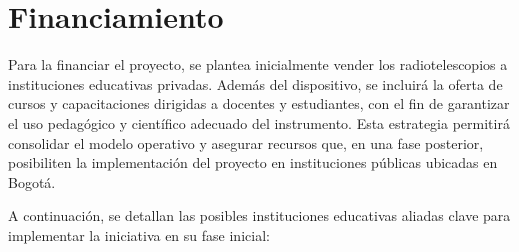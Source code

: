 \section{Financiamiento}%
\label{sec:Financiamiento}

Para la financiar el proyecto, se plantea inicialmente vender los
radiotelescopios a instituciones educativas privadas.
Además del dispositivo, se incluirá la oferta de cursos y capacitaciones
dirigidas a docentes y estudiantes, con el fin de garantizar el uso pedagógico
y científico adecuado del instrumento.
Esta estrategia permitirá consolidar el modelo operativo y asegurar recursos que,
en una fase posterior, posibiliten la implementación del proyecto en
instituciones públicas ubicadas en Bogotá.

A continuación, se detallan las posibles instituciones educativas aliadas clave
para implementar la iniciativa en su fase inicial:

